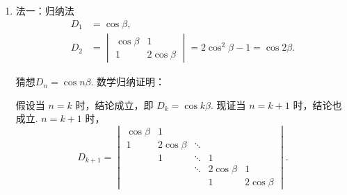 \begin{solution}
    \begin{enumerate}
        \item 法一：归纳法
            \begin{align*}
                D_1 & =\cos\beta,                               \\
                D_2 & =\begin{vmatrix}
                            \cos\beta & 1          \\
                            1         & 2\cos\beta
                        \end{vmatrix}=2\cos^2\beta-1=\cos2\beta.
            \end{align*}

            猜想$D_n=\cos n\beta$. 数学归纳证明：

            假设当 $n=k$ 时，结论成立，即 $D_{k}=\cos k \beta$. 现证当 $n=k+1$ 时，结论也成立. $ n=k+1 $ 时，
            \[ D_{k+1} = \begin{vmatrix}
                    \cos \beta & 1            &        &              &              \\
                    1          & 2 \cos \beta & \ddots &              &              \\
                                & 1            & \ddots & 1            &              \\
                                &              & \ddots & 2 \cos \beta & 1            \\
                                &              &        & 1            & 2 \cos \beta
                \end{vmatrix}. \]


\end{enumerate}
\end{solution}

